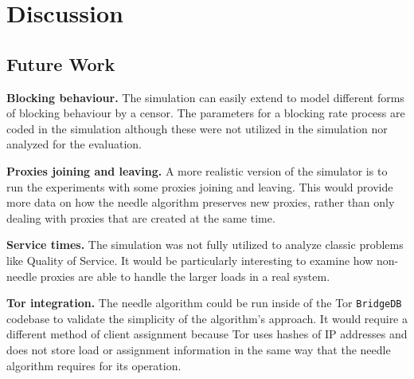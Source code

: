 \chapter{Discussion}
\label{sec:discussion}

\section{Future Work}

\textbf{Blocking behaviour.} The simulation can easily extend to model different forms of blocking behaviour by a censor. The parameters for a blocking rate process are coded in the simulation although these were not utilized in the simulation nor analyzed for the evaluation.  

\textbf{Proxies joining and leaving.} A more realistic version of the simulator is to run the experiments with some proxies joining and leaving. This would provide more data on how the needle algorithm preserves new proxies, rather than only dealing with proxies that are created at the same time.

\textbf{Service times.} The simulation was not fully utilized to analyze classic problems like Quality of Service. It would be particularly interesting to examine how non-needle proxies are able to handle the larger loads in a real system.

\textbf{Tor integration.} The needle algorithm could be run inside of the Tor \texttt{BridgeDB} codebase to validate the simplicity of the algorithm's approach. It would require a different method of client assignment because Tor uses hashes of \ac{IP} addresses and does not store load or assignment information in the same way that the needle algorithm requires for its operation.